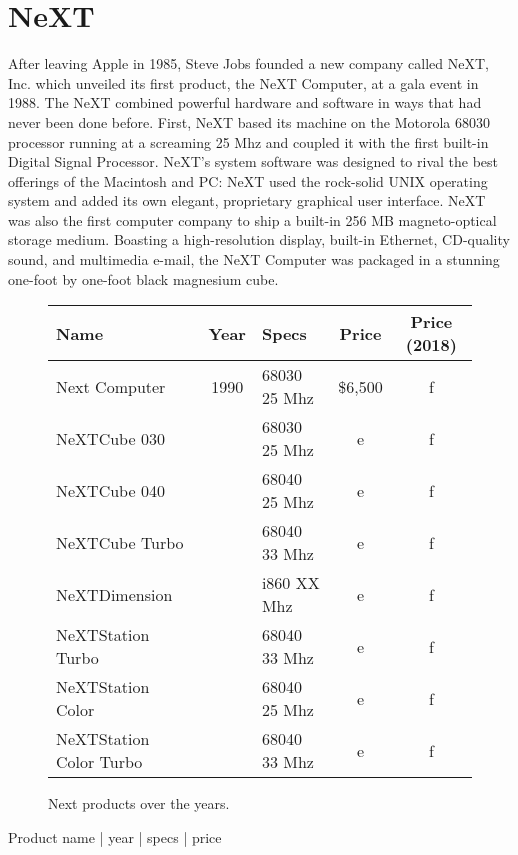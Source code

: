 \section{NeXT}
After leaving Apple in 1985, Steve Jobs founded a new company called NeXT, Inc. which unveiled its first product, the NeXT Computer, at a gala event in 1988. The NeXT combined powerful hardware and software in ways that had never been done before. First, NeXT based its machine on the Motorola 68030 processor running at a screaming 25 Mhz and coupled it with the first built-in Digital Signal Processor.  NeXT's system software was designed to rival the best offerings of the Macintosh and PC: NeXT used the rock-solid UNIX operating system and added its own elegant, proprietary graphical user interface.  NeXT was also the first computer company to ship a built-in 256 MB magneto-optical storage medium.  Boasting a high-resolution display, built-in Ethernet, CD-quality sound, and multimedia e-mail, the NeXT Computer was packaged in a stunning one-foot by one-foot black magnesium cube.\\
\par

 \begin{figure}[H]
\centering  
\begin{tabularx}{\textwidth}{ X  c  X  c  c}
  \toprule
  \textbf{Name} &  \textbf{Year} & \textbf{Specs} & \textbf{Price} & \textbf{Price (2018)}	 \\
  \toprule 
   Next Computer           & 1990 & 68030 25 Mhz & \$6,500 & f \\
   NeXTCube 030            &      & 68030 25 Mhz & e & f \\
   NeXTCube 040            &      & 68040 25 Mhz & e & f \\
   NeXTCube Turbo          &      & 68040 33 Mhz & e & f \\
   NeXTDimension           &      & i860  XX Mhz & e & f \\
   NeXTStation Turbo       &      & 68040 33 Mhz & e & f \\
   NeXTStation Color       &      & 68040 25 Mhz & e & f \\
   NeXTStation Color Turbo &      & 68040 33 Mhz & e & f \\
   \toprule
\end{tabularx}
\caption{Next products over the years.}
\end{figure}
\par


Product name | year | specs | price

